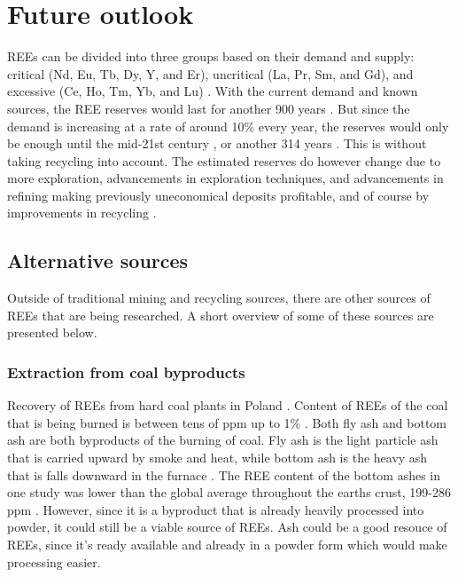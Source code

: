 \section{Future outlook}

REEs can be divided into three groups based on their demand and supply: critical (Nd, Eu, Tb, Dy, Y, and Er), uncritical (La, Pr, Sm, and Gd), and excessive (Ce, Ho, Tm, Yb, and Lu) \cite{coalPoland}. With the current demand and known sources, the REE reserves would last for another 900 years \cite{britannica2024}. But since the demand is increasing at a rate of around 10\% every year, the reserves would only be enough until the mid-21st century \cite{britannica2024}, or another 314 years \cite{coalPoland}. This is without taking recycling into account. The estimated reserves do however change due to more exploration, advancements in exploration techniques, and advancements in refining making previously uneconomical deposits profitable, and of course by improvements in recycling \cite{REETechnology}.

\subsection{Alternative sources}

Outside of traditional mining and recycling sources, there are other sources of REEs that are being researched. A short overview of some of these sources are presented below.

\subsubsection{Extraction from coal byproducts}

Recovery of REEs from hard coal plants in Poland \cite{USDoE2024}. Content of REEs of the coal that is being burned is between tens of ppm up to 1\% \cite{coalPoland}. Both fly ash and bottom ash are both byproducts of the burning of coal. Fly ash is the light particle ash that is carried upward by smoke and heat, while bottom ash is the heavy ash that is falls downward in the furnace \cite{ashPalmer}. The REE content of the bottom ashes in one study was lower than the global average throughout the earths crust, 199-286 ppm \cite{coalPoland}. However, since it is a byproduct that is already heavily processed into powder, it could still be a viable source of REEs. Ash could be a good resouce of REEs, since it's ready available and already in a powder form which would make processing easier.

